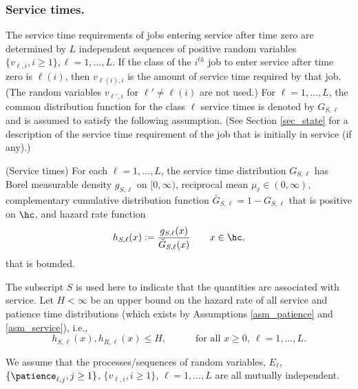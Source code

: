 \documentclass{article}
\begin{document}
\subsubsection*{Service times.}
The service time requirements of jobs entering service after time zero are determined by $L$ independent sequences of positive random variables  $\{v_{\ell,i},i\geq1\}, \ell=1,...,L.$ 
If the class of the $i^{th}$ job to enter service after time zero is $\ell(i)$, then $v_{\ell(i), i}$ is the amount of service time required by that job. (The random variables 
$v_{\ell', i}$ for $\ell'\not=\ell(i)$ are not used.) For $\ell =1, \ldots, L$, 
the common distribution function for the class $\ell$ service times is denoted by $G_{S,\ell}$ and is assumed to satisfy the following assumption. 
(See Section \ref{sec_state} for a description of the service time requirement of the job that is initially in service (if any).)

\begin{assumption}\label{asm_service}
  (Service times) For each $\ell=1,...,L$, the service time distribution $G_{S,\ell}$ has Borel measurable density $g_{S,\ell}$ on $[0,\infty)$, reciprocal mean $\mu_{\ell}\in(0,\infty),$ complementary cumulative distribution function $\bar G_{S,\ell}=1-G_{S,\ell}$ that is positive on $\hc$, and hazard rate function 
\[
h_{S,\ell}(x):=\frac{g_{S,\ell}(x)}{\bar G_{S,\ell}(x)}\quad\quad x\in\hc,
\]
that is bounded.
\end{assumption}
The subscript $S$ is used here to indicate that the quantities are associated with service. Let $H<\infty$ be an upper bound on the hazard rate of all service and patience time distributions (which exists by Assumptions \ref{asm_patience} and \ref{asm_service}), i.e.,
\begin{equation}\label{def-H}
h_{S,\ell}(x),h_{R,\ell}(x)\leq H,  \quad\quad\quad \text{for all }x\geq0,\ \ell=1,...,L.
\end{equation}

We assume that the processes/sequences of random variables,  $E_\ell$, $\{ \patience_{\ell, j}, j\geq 1\}$, $\{v_{\ell, i} , i\geq 1\}$, $\ell =1, \ldots, L$ are all mutually independent.
\end{document}
